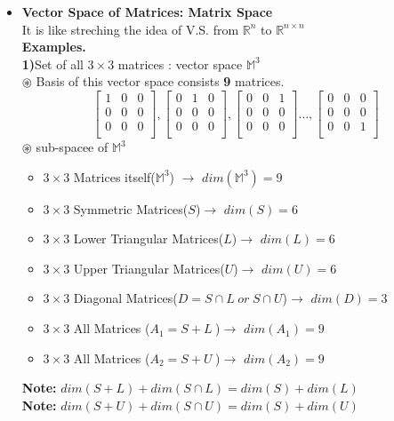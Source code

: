 \documentclass[a4paper,11pt]{article}
\numberwithin{equation}{section}
\begin{document}
\begin{itemize}
\item \textbf{Vector Space of Matrices: Matrix Space}\\
 
It is like streching the idea of V.S. from $\mathbb{R}^n$ to $\mathbb{R}^{n\times n} $ \\

\textbf{Examples.} \\

\textbf{1)}Set of all $3\times 3$ matrices : vector space \textbf{$\mathbb{M}^3$}\\
\textbf{$\circledast$ }Basis of this vector space consists \textbf{9} matrices.
\begin{equation}
    \begin{bmatrix}
        1&0&0\\0&0&0\\0&0&0\\
    \end{bmatrix},
    \begin{bmatrix}
        0&1&0\\0&0&0\\0&0&0\\
    \end{bmatrix},
    \begin{bmatrix}
        0&0&1\\0&0&0\\0&0&0\\
    \end{bmatrix}\dots,
    \begin{bmatrix}
        0&0&0\\0&0&0\\0&0&1\\
    \end{bmatrix}
\end{equation}
\textbf{$\circledast$ }sub-spacee of $\mathbb{M}^3$\\
\begin{itemize}
    \item $3\times 3$ Matrices itself($\mathbb{M}^3$) $\rightarrow$ $dim(\mathbb{M}^3)=9$
    \item $3\times 3$ Symmetric Matrices($S$)$\rightarrow$ $dim(S)=6$
    \item $3\times 3$ Lower Triangular Matrices($L$)$\rightarrow$ $dim(L)=6$
    \item $3\times 3$ Upper Triangular Matrices($U$)$\rightarrow$ $dim(U)=6$
    \item $3\times 3$ Diagonal Matrices($D=S\cap L\hspace{3pt} or \hspace{3pt} S\cap U$)$\rightarrow$ $dim(D)=3$
    \item $3\times 3$ All Matrices ($A_1=S+L\hspace{3pt}$)$\rightarrow$ $dim(A_1)=9$
    \item $3\times 3$ All Matrices ($A_2=S+U\hspace{3pt}$)$\rightarrow$ $dim(A_2)=9$
\end{itemize}
\textbf{Note: }$dim(S+L)+dim(S\cap L)=dim(S)+dim(L)$\\
\textbf{Note: }$dim(S+U)+dim(S\cap U)=dim(S)+dim(U)$\\


\end{itemize}
\end{document}

